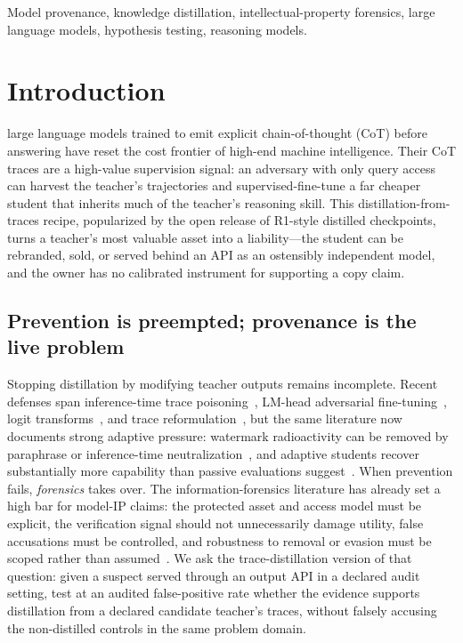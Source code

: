 \documentclass[journal]{IEEEtran}
\begin{document}
\begin{IEEEkeywords}
Model provenance, knowledge distillation, intellectual-property forensics, large language models, hypothesis testing, reasoning models.
\end{IEEEkeywords}

\section{Introduction}
\label{sec:intro}

 large language models trained to emit explicit
chain-of-thought (CoT) before answering have reset the cost frontier of high-end
machine intelligence. Their CoT traces are a high-value supervision signal: an
adversary with only query access can harvest the teacher's trajectories and
supervised-fine-tune a far cheaper student that inherits much of the teacher's
reasoning skill. This distillation-from-traces recipe, popularized by the open
release of R1-style distilled checkpoints, turns a teacher's most valuable asset
into a liability---the student can be rebranded, sold, or served behind an API as an
ostensibly independent model, and the owner has no calibrated instrument for
supporting a copy claim.

\subsection{Prevention is preempted; provenance is the live problem}
Stopping distillation by modifying teacher outputs remains incomplete. Recent
defenses span inference-time trace poisoning~\cite{savani2025antidistillationsampling},
LM-head adversarial fine-tuning~\cite{li2025doge}, logit transforms~\cite{fang2026cmi},
and trace reformulation~\cite{ding2025part, ma2026tracerewriting}, but the same
literature now documents strong adaptive pressure: watermark radioactivity can be
removed by paraphrase or inference-time neutralization~\cite{pan2025watermarkdistillation},
and adaptive students recover substantially more capability than passive evaluations
suggest~\cite{allouah2026distillationgame}. When prevention fails,
\emph{forensics} takes over. The information-forensics literature has already set a
high bar for model-IP claims: the protected asset and access model must be explicit,
the verification signal should not unnecessarily damage utility, false accusations
must be controlled, and robustness to removal or evasion must be scoped rather than
assumed~\cite{zheng2022dnnfingerprint, zhang2023cip, li2023dvbw,
zhou2024inversionguided, xu2025ipprotection}. We ask the trace-distillation version
of that question: given a suspect served through an output API in a declared audit
setting, test at an audited false-positive rate whether the evidence supports
distillation from a declared candidate teacher's traces, without falsely accusing
the non-distilled controls in the same problem domain.
\end{document}
